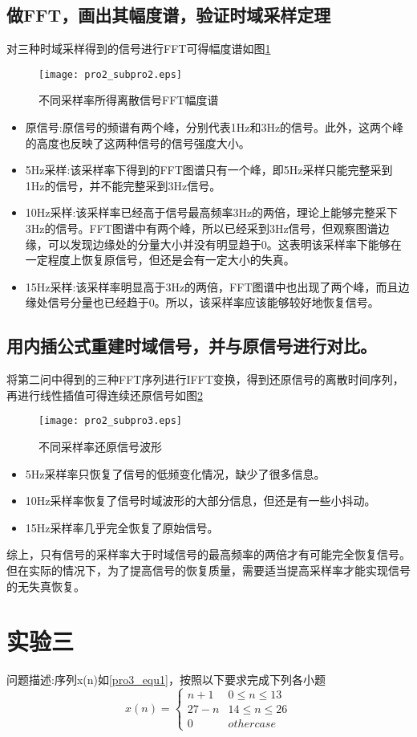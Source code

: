 \documentclass[fleqn,10pt]{SelfArx} %
\begin{document}
\begin{CJK}{UTF8}{gkai}
\subsection{做FFT，画出其幅度谱，验证时域采样定理}
对三种时域采样得到的信号进行FFT可得幅度谱如图\ref{pro2_fig2}
\begin{figure}
  \centering
  \texttt{[image: pro2\_subpro2.eps]}
  \caption{不同采样率所得离散信号FFT幅度谱}
  \label{pro2_fig2}
\end{figure}
\begin{itemize}
  \item 原信号:原信号的频谱有两个峰，分别代表1Hz和3Hz的信号。此外，这两个峰的高度也反映了这两种信号的信号强度大小。
  \item 5Hz采样:该采样率下得到的FFT图谱只有一个峰，即5Hz采样只能完整采到1Hz的信号，并不能完整采到3Hz信号。
  \item 10Hz采样:该采样率已经高于信号最高频率3Hz的两倍，理论上能够完整采下3Hz的信号。FFT图谱中有两个峰，所以已经采到3Hz信号，但观察图谱边缘，可以发现边缘处的分量大小并没有明显趋于0。这表明该采样率下能够在一定程度上恢复原信号，但还是会有一定大小的失真。
  \item 15Hz采样:该采样率明显高于3Hz的两倍，FFT图谱中也出现了两个峰，而且边缘处信号分量也已经趋于0。所以，该采样率应该能够较好地恢复信号。
\end{itemize}

\subsection{用内插公式重建时域信号，并与原信号进行对比。}
将第二问中得到的三种FFT序列进行IFFT变换，得到还原信号的离散时间序列，再进行线性插值可得连续还原信号如图\ref{pro2_fig3}
\begin{figure}
  \centering
  \texttt{[image: pro2\_subpro3.eps]}
  \caption{不同采样率还原信号波形}
  \label{pro2_fig3}
\end{figure}
\begin{itemize}
  \item 5Hz采样率只恢复了信号的低频变化情况，缺少了很多信息。
  \item 10Hz采样率恢复了信号时域波形的大部分信息，但还是有一些小抖动。
  \item 15Hz采样率几乎完全恢复了原始信号。
\end{itemize}
综上，只有信号的采样率大于时域信号的最高频率的两倍才有可能完全恢复信号。但在实际的情况下，为了提高信号的恢复质量，需要适当提高采样率才能实现信号的无失真恢复。

\section{实验三}
问题描述:序列x(n)如\ref{pro3_equ1}，按照以下要求完成下列各小题
\begin{equation}
  x(n)=\left\{
  \begin{array}{cc}
    n+1 & 0\leq n\leq13\\
    27-n & 14\leq n\leq26\\
    0 & other case
  \end{array}
  \right.
  \label{pro3_equ1}
\end{equation}

\end{CJK}
\end{document}
